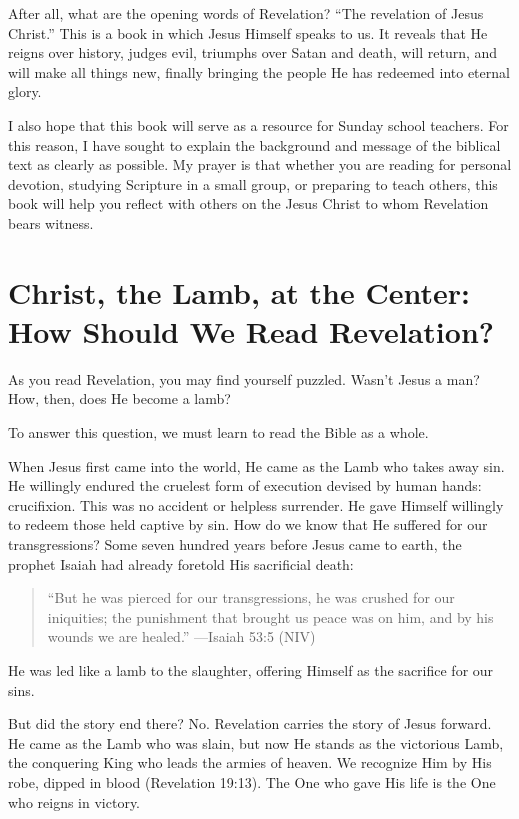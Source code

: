 After all, what are the opening words of Revelation? ``The revelation of Jesus Christ.'' This is a book in which Jesus Himself speaks to us. It reveals that He reigns over history, judges evil, triumphs over Satan and death, will return, and will make all things new, finally bringing the people He has redeemed into eternal glory.

I also hope that this book will serve as a resource for Sunday school teachers. For this reason, I have sought to explain the background and message of the biblical text as clearly as possible. My prayer is that whether you are reading for personal devotion, studying Scripture in a small group, or preparing to teach others, this book will help you reflect with others on the Jesus Christ to whom Revelation bears witness.

\section*{Christ, the Lamb, at the Center: How Should We Read Revelation?}

As you read Revelation, you may find yourself puzzled. Wasn't Jesus a man? How, then, does He become a lamb?

To answer this question, we must learn to read the Bible as a whole.

When Jesus first came into the world, He came as the Lamb who takes away sin. He willingly endured the cruelest form of execution devised by human hands: crucifixion. This was no accident or helpless surrender. He gave Himself willingly to redeem those held captive by sin. How do we know that He suffered for our transgressions? Some seven hundred years before Jesus came to earth, the prophet Isaiah had already foretold His sacrificial death:

\begin{quote}
``But he was pierced for our transgressions, he was crushed for our iniquities; the punishment that brought us peace was on him, and by his wounds we are healed.''
---Isaiah 53:5 (NIV)
\end{quote}

He was led like a lamb to the slaughter, offering Himself as the sacrifice for our sins.

But did the story end there? No. Revelation carries the story of Jesus forward. He came as the Lamb who was slain, but now He stands as the victorious Lamb, the conquering King who leads the armies of heaven. We recognize Him by His robe, dipped in blood (Revelation 19:13). The One who gave His life is the One who reigns in victory.

